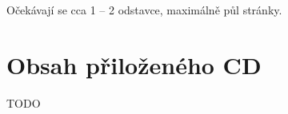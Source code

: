 \documentclass[11pt,twoside,a4paper]{book}
\begin{document}
	\noindent
	Očekávají se cca 1 -- 2 odstavce, maximálně půl stránky.

	\tableofcontents		%

	\listoffigures			%
	\listoftables			%
	\lstlistoflistings         %

	\mainbodystarts












{
\def\CS{$\cal C\kern-0.1667em\lower.5ex\hbox{$\cal S$}\kern-0.075em $}

}

\appendix

\printnomenclature
\label{apx:zkratky}

\chapter{Obsah přiloženého CD}

TODO
\end{document}
